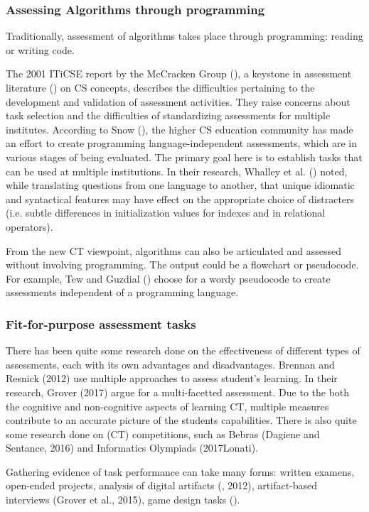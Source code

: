 \subsubsection*{Assessing Algorithms through programming}
Traditionally, assessment of algorithms takes place through programming: reading or writing code.

The 2001 ITiCSE report by the McCracken Group (\cite{McCracken2001}), a keystone in assessment literature (\cite{Giordano2015}) on CS concepts, describes the difficulties pertaining to the development and validation of assessment activities. They raise concerns about task selection and the difficulties of standardizing assessments for multiple institutes. According to Snow (\cite{snow2017CTECD}), the higher CS education community has made an effort to create programming language-independent assessments, which are in various stages of being evaluated. The primary goal here is to establish tasks that can be used at multiple institutions. In their research, Whalley et al. (\cite{Whalley2006}) noted, while translating questions from one language to another, that unique idiomatic and syntactical features may have effect on the appropriate choice of distracters (i.e. subtle differences in initialization values for indexes and in relational operators).

From the new CT viewpoint, algorithms can also be articulated and assessed without involving programming. The output could be a flowchart \cite{Smetsers2017} or pseudocode. For example, Tew and Guzdial (\cite{2010TewGuzdial}) choose for a wordy pseudocode to create assessments independent of a programming language.


\subsubsection*{Fit-for-purpose assessment tasks}
There has been quite some research done on the effectiveness of different types of assessments, each with its own advantages and disadvantages. Brennan and Resnick (2012) use multiple approaches to assess student's learning. In their research, Grover (2017) argue for a multi-facetted assessment. Due to the both the cognitive and non-cognitive aspects of learning CT, multiple measures contribute to an accurate picture of the students capabilities. There is also quite some research done on (CT) competitions, such as Bebras (Dagiene and Sentance, 2016) and Informatics Olympiads (2017Lonati).


Gathering evidence of task performance can take many forms: written examens, open-ended projects, analysis of digital artifacts (\cite{BrennanResnick2012}, 2012), artifact-based interviews (Grover et al., 2015), game design tasks (\cite{snow2017CTECD}).


